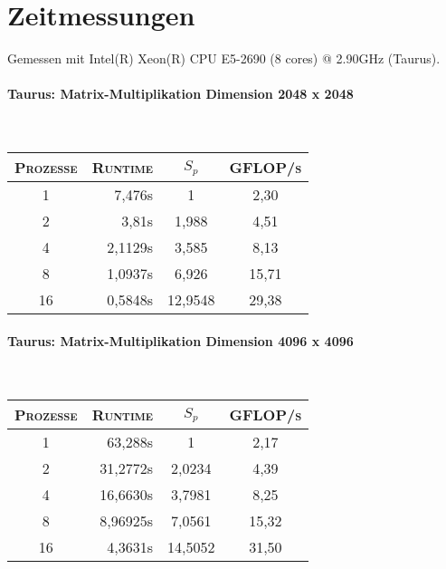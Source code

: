 \section{Zeitmessungen}
Gemessen mit Intel(R) Xeon(R) CPU E5-2690 (8 cores) @ 2.90GHz (Taurus).
\paragraph{Taurus: Matrix-Multiplikation Dimension 2048 x 2048}\hfill\\
\begin{tabular}{|c|r|c|c|}
	\hline
	\textsc{Prozesse} & \textsc{Runtime} & \textsc{$S_p$} & \textsc{GFLOP/s} \\
	
	\hline
	\hline
	1 & 7,476s & 1 & 2,30 \\
	\hline
	2 & 3,81s & 1,988 & 4,51 \\
	\hline
	4 & 2,1129s & 3,585 & 8,13 \\
	\hline
	8 & 1,0937s & 6,926 & 15,71 \\
	\hline
	16 & 0,5848s & 12,9548 & 29,38 \\
	\hline

\end{tabular}

\paragraph{Taurus: Matrix-Multiplikation Dimension 4096 x 4096}\hfill\\
\begin{tabular}{|c|r|c|c|}
	\hline
	\textsc{Prozesse} & \textsc{Runtime} & \textsc{$S_p$} & \textsc{GFLOP/s} \\
	
	\hline
	\hline
	1 & 63,288s & 1 & 2,17 \\
	\hline
	2 & 31,2772s & 2,0234 & 4,39 \\
	\hline
	4 & 16,6630s & 3,7981 & 8,25 \\
	\hline
	8 & 8,96925s & 7,0561 & 15,32 \\
	\hline
	16 & 4,3631s & 14,5052 & 31,50 \\
	\hline

\end{tabular}

